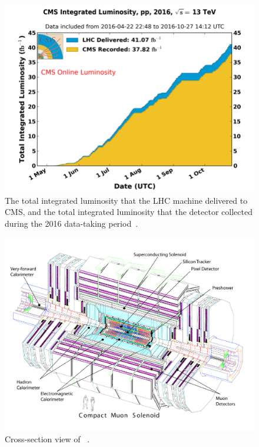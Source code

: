 \begin{figure}
  \centering
  \includegraphics[width=\textwidth]{figs/CMSLUMI.png}
  \caption{The total integrated luminosity that the LHC machine delivered to CMS, and the total integrated luminosity that the detector collected during the 2016 data-taking period~\cite{CMSLumi}.}
  \label{fig:CMSlumi}
\end{figure}

\begin{figure}
  \centering
  \includegraphics[width=0.8\textheight]{figs/CMScrosssection.pdf}
  \caption{Cross-section view of \CMS~\cite{Chatrchyan:2008aa}.}
  \label{fig:CMSCrossSection}
\end{figure}

